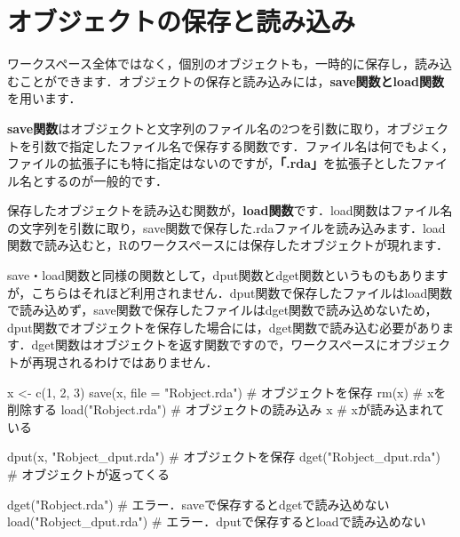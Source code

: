 \documentclass[
  letterpaper,
  DIV=11,
  numbers=noendperiod]{scrreprt}
\newenvironment{Shaded}{\begin{snugshade}}{\end{snugshade}}
\newcommand{\AttributeTok}[1]{\textcolor[rgb]{0.40,0.45,0.13}{#1}}
\newcommand{\CommentTok}[1]{\textcolor[rgb]{0.37,0.37,0.37}{#1}}
\newcommand{\DecValTok}[1]{\textcolor[rgb]{0.68,0.00,0.00}{#1}}
\newcommand{\FunctionTok}[1]{\textcolor[rgb]{0.28,0.35,0.67}{#1}}
\newcommand{\NormalTok}[1]{\textcolor[rgb]{0.00,0.23,0.31}{#1}}
\newcommand{\OtherTok}[1]{\textcolor[rgb]{0.00,0.23,0.31}{#1}}
\newcommand{\StringTok}[1]{\textcolor[rgb]{0.13,0.47,0.30}{#1}}
\begin{document}
\hypertarget{ux30aaux30d6ux30b8ux30a7ux30afux30c8ux306eux4fddux5b58ux3068ux8aadux307fux8fbcux307f}{%
\section{オブジェクトの保存と読み込み}\label{ux30aaux30d6ux30b8ux30a7ux30afux30c8ux306eux4fddux5b58ux3068ux8aadux307fux8fbcux307f}}

ワークスペース全体ではなく，個別のオブジェクトも，一時的に保存し，読み込むことができます．オブジェクトの保存と読み込みには，\textbf{save関数とload関数}を用います．

\textbf{save関数}はオブジェクトと文字列のファイル名の2つを引数に取り，オブジェクトを引数で指定したファイル名で保存する関数です．ファイル名は何でもよく，ファイルの拡張子にも特に指定はないのですが，\textbf{「.rda」}を拡張子としたファイル名とするのが一般的です．

保存したオブジェクトを読み込む関数が，\textbf{load関数}です．load関数はファイル名の文字列を引数に取り，save関数で保存した.rdaファイルを読み込みます．load関数で読み込むと，Rのワークスペースには保存したオブジェクトが現れます．

save・load関数と同様の関数として，dput関数とdget関数というものもありますが，こちらはそれほど利用されません．dput関数で保存したファイルはload関数で読み込めず，save関数で保存したファイルはdget関数で読み込めないため，dput関数でオブジェクトを保存した場合には，dget関数で読み込む必要があります．dget関数はオブジェクトを返す関数ですので，ワークスペースにオブジェクトが再現されるわけではありません．

\begin{Shaded}
\begin{Highlighting}[]
\NormalTok{x }\OtherTok{\textless{}{-}} \FunctionTok{c}\NormalTok{(}\DecValTok{1}\NormalTok{, }\DecValTok{2}\NormalTok{, }\DecValTok{3}\NormalTok{)}
\FunctionTok{save}\NormalTok{(x, }\AttributeTok{file =} \StringTok{"Robject.rda"}\NormalTok{) }\CommentTok{\# オブジェクトを保存}
\FunctionTok{rm}\NormalTok{(x) }\CommentTok{\# xを削除する}
\FunctionTok{load}\NormalTok{(}\StringTok{"Robject.rda"}\NormalTok{) }\CommentTok{\# オブジェクトの読み込み}
\NormalTok{x }\CommentTok{\# xが読み込まれている}

\FunctionTok{dput}\NormalTok{(x, }\StringTok{"Robject\_dput.rda"}\NormalTok{) }\CommentTok{\# オブジェクトを保存}
\FunctionTok{dget}\NormalTok{(}\StringTok{"Robject\_dput.rda"}\NormalTok{) }\CommentTok{\# オブジェクトが返ってくる}

\FunctionTok{dget}\NormalTok{(}\StringTok{"Robject.rda"}\NormalTok{) }\CommentTok{\# エラー．saveで保存するとdgetで読み込めない}
\FunctionTok{load}\NormalTok{(}\StringTok{"Robject\_dput.rda"}\NormalTok{) }\CommentTok{\# エラー．dputで保存するとloadで読み込めない}
\end{Highlighting}
\end{Shaded}
\end{document}
